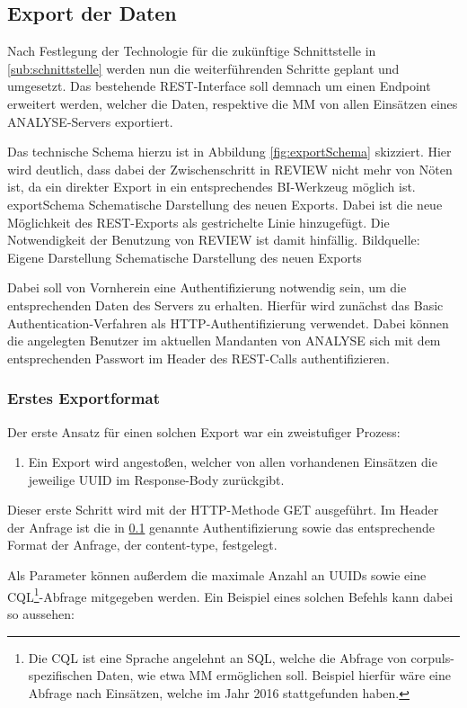 \subsection{Export der Daten} %
\label{sub:export}
Nach Festlegung der Technologie für die zukünftige Schnittstelle in \ref{sub:schnittstelle} werden nun die weiterführenden Schritte geplant und umgesetzt.
Das bestehende \gls{REST}-Interface soll demnach um einen Endpoint erweitert werden, welcher die Daten, respektive die \gls{MM} von allen Einsätzen eines \gls{ANALYSE}-Servers exportiert.

Das technische Schema hierzu ist in Abbildung \ref{fig:exportSchema} skizziert.
Hier wird deutlich, dass dabei der Zwischenschritt in \gls{REVIEW} nicht mehr von Nöten ist, da ein direkter Export in ein entsprechendes \gls{BI}-Werkzeug möglich ist.
\bildbreit
{exportSchema}
{Schematische Darstellung des neuen Exports. Dabei ist die neue Möglichkeit des REST-Exports als gestrichelte Linie hinzugefügt. Die Notwendigkeit der Benutzung von \acrlong{REVIEW} ist damit hinfällig. Bildquelle: Eigene Darstellung}
{Schematische Darstellung des neuen Exports}

Dabei soll von Vornherein eine Authentifizierung notwendig sein, um die entsprechenden Daten des Servers zu erhalten.
Hierfür wird zunächst das \glqq Basic Authentication\grqq-Verfahren als HTTP-Authentifizierung verwendet. 
Dabei können die angelegten Benutzer im aktuellen Mandanten von \gls{ANALYSE} sich mit dem entsprechenden Passwort im Header des \gls{REST}-Calls authentifizieren.

\subsubsection{Erstes Exportformat}
\label{subsub:1stexport}
Der erste Ansatz für einen solchen Export war ein zweistufiger Prozess:
\begin{enumerate}
\item Ein Export wird angestoßen, welcher von allen vorhandenen Einsätzen die jeweilige \gls{UUID} im Response-Body zurückgibt.
\end{enumerate}

Dieser erste Schritt wird mit der HTTP-Methode \glqq GET\grqq{} ausgeführt.
Im Header der Anfrage ist die in \ref{sub:export} genannte Authentifizierung sowie das entsprechende Format der Anfrage, der \glqq content-type\grqq, festgelegt.

Als Parameter können außerdem die maximale Anzahl an UUIDs sowie eine \gls{CQL}\footnote{Die \gls{CQL} ist eine \glqq Sprache\grqq{} angelehnt an SQL, welche die Abfrage von corpuls-spezifischen Daten, wie etwa \gls{MM} ermöglichen soll. Beispiel hierfür wäre eine Abfrage nach Einsätzen, welche im Jahr 2016 stattgefunden haben.}-Abfrage mitgegeben werden.
Ein Beispiel eines solchen Befehls kann dabei so aussehen:

